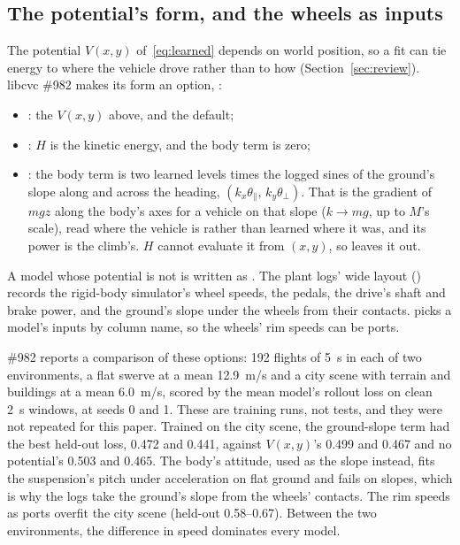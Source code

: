 \documentclass[11pt]{article}
\theoremstyle{remark}
\begin{document}
\subsection{The potential's form, and the wheels as inputs}
\label{sec:learned-potential}
The potential $V(x,y)$ of~\eqref{eq:learned} depends on world position, so a fit can tie energy to
where the vehicle drove rather than to how (Section~\ref{sec:review}). libcvc \#982 makes its form
an option, :
\begin{itemize}
  \item {}: the $V(x,y)$ above, and the default;
  \item {}: $H$ is the kinetic energy, and the body term is zero;
  \item {}: the body term is two learned levels times the logged sines of the ground's
        slope along and across the heading, $(k_x\theta_\parallel,\,k_y\theta_\perp)$. That is the
        gradient of $mgz$ along the body's axes for a vehicle on that slope ($k\to mg$, up to $M$'s
        scale), read where the vehicle is rather than learned where it was, and its power is the
        climb's. $H$ cannot evaluate it from $(x,y)$, so  leaves it out.
\end{itemize}
A model whose potential is not  is written as . The plant logs' wide
layout () records the rigid-body simulator's wheel speeds, the pedals,
the drive's shaft and brake power, and the ground's slope under the wheels from their contacts.
 picks a model's inputs by column name, so the wheels' rim speeds can be
ports.

\#982 reports a comparison of these options: 192 flights of 5~s in each of two environments, a flat
swerve at a mean 12.9~m/s and a city scene with terrain and buildings at a mean 6.0~m/s, scored by
the mean model's rollout loss on clean 2~s windows, at seeds 0 and 1. These are training runs, not
tests, and they were not repeated for this paper. Trained on the city scene, the ground-slope term
had the best held-out loss, 0.472 and 0.441, against $V(x,y)$'s 0.499 and 0.467 and no potential's
0.503 and 0.465. The body's attitude, used as the slope instead, fits the suspension's pitch under
acceleration on flat ground and fails on slopes, which is why the logs take the ground's slope from
the wheels' contacts. The rim speeds as ports overfit the city scene (held-out 0.58--0.67). Between
the two environments, the difference in speed dominates every model.
\end{document}
